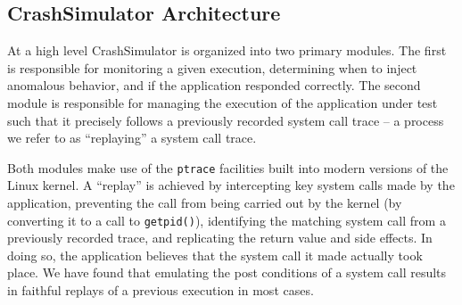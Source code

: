 
    \subsection{CrashSimulator Architecture}
        
    At a high level CrashSimulator is organized into two primary modules. The
    first is responsible for monitoring a given execution, determining
    when to inject anomalous behavior, and if the
    application responded correctly.  The second module
    is responsible for managing the execution of the application under test such
    that it precisely follows a previously recorded system call trace -- a
    process we refer to as ``replaying'' a system call trace.

        
    Both modules make use of the {\tt ptrace} facilities built into modern
    versions of the Linux kernel.  A ``replay''
    is achieved by intercepting key system calls made by the application,
    preventing the call from being carried out by the kernel (by
    converting it to a call to {\tt getpid()}), identifying the matching system
    call from a previously recorded trace, and replicating the return value
    and side effects. In doing so, the application believes that the system call it
    made actually took place. We have found that emulating the post conditions
    of a system call results in faithful replays of a
    previous execution in most cases.

